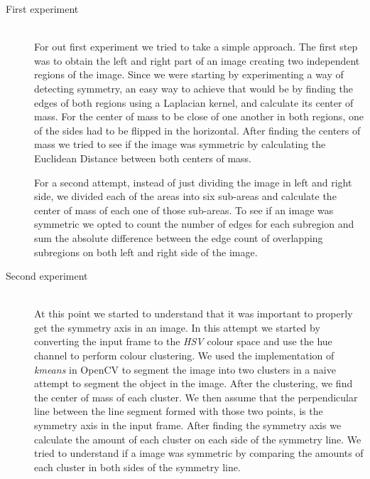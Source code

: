 \begin{description}
	\item[First experiment] \hfill \\
	For out first experiment we tried to take a simple approach. The first step was to obtain the left and right part of an image creating two independent regions of the image. Since we were starting by experimenting a way of detecting symmetry, an easy way to achieve that would be by finding the edges of both regions using a Laplacian kernel, and calculate its center of mass. For the center of mass to be close of one another in both regions, one of the sides had to be flipped in the horizontal. After finding the centers of mass we tried to see if the image was symmetric by calculating the Euclidean Distance between both centers of mass.
	
	For a second attempt, instead of just dividing the image in left and right side, we divided each of the areas into six sub-areas and calculate the center of mass of each one of those sub-areas. To see if an image was symmetric we opted to count the number of edges for each subregion and sum the absolute difference between the edge count of overlapping subregions on both left and right side of the image.
	
	\item[Second experiment] \hfill \\
	At this point we started to understand that it was important to properly get the symmetry axis in an image. In this attempt we started by converting the input frame to the \emph{HSV} colour space and use the hue channel to perform colour clustering. We used the implementation of \emph{kmeans} in OpenCV \cite{OCV} to segment the image into two clusters in a naive attempt to segment the object in the image. After the clustering, we find the center of mass of each cluster. We then assume that the perpendicular line between the line segment formed with those two points, is the symmetry axis in the input frame. After finding the symmetry axis we calculate the amount of each cluster on each side of the symmetry line. We tried to understand if a image was symmetric by comparing the amounts of each cluster in both sides of the symmetry line.


\end{description}
